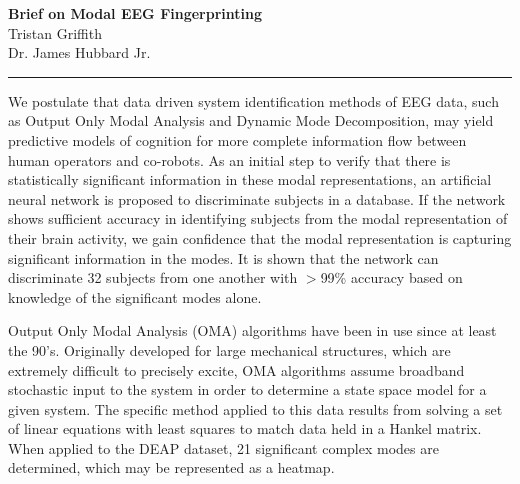 \rhead{\today}
\begin{center}
{\textbf{\Large Brief on Modal EEG Fingerprinting}}\\
\vspace{2mm}
{\large  Tristan Griffith}\\
\vspace{2mm}
{\large Dr. James Hubbard Jr.}
\noindent\rule{\textwidth}{2pt}
\end{center}

We postulate that data driven system identification methods of EEG data, such as Output Only Modal Analysis and Dynamic Mode Decomposition, may yield predictive models of cognition for more complete information flow between human operators and co-robots. As an initial step to verify that there is statistically significant information in these modal representations, an artificial neural network is proposed to discriminate subjects in a database. If the network shows sufficient accuracy in identifying subjects from the modal representation of their brain activity, we gain confidence that the modal representation is capturing significant information in the modes. It is shown that the network can discriminate 32 subjects from one another with $>$99\% accuracy based on knowledge of the significant modes alone.\


Output Only Modal Analysis (OMA) algorithms have been in use since at least the 90's. Originally developed for large mechanical structures, which are extremely difficult to precisely excite, OMA algorithms assume broadband stochastic input to the system in order to determine a state space model for a given system. The specific method applied to this data results from solving a set of linear equations with least squares to match data held in a Hankel matrix. When applied to the DEAP dataset, 21 significant complex modes are determined, which may be represented as a heatmap.\

